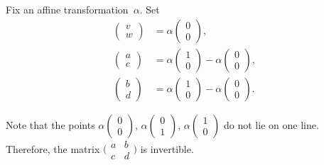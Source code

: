 Fix an affine transformation~$\alpha$.
Set 
\begin{align*}
\left(\begin{smallmatrix}
v\\ w
\end{smallmatrix} \right)
&= 
\alpha\left(\begin{smallmatrix}
0\\ 0
\end{smallmatrix} \right),
\\
\left(\begin{smallmatrix}
a\\ c
\end{smallmatrix} \right)
&=
\alpha\left(\begin{smallmatrix}
1\\ 0
\end{smallmatrix} \right)
-
\alpha\left(\begin{smallmatrix}
0\\ 0
\end{smallmatrix} \right),
\\
\left(\begin{smallmatrix}
b\\ d
\end{smallmatrix} \right)
&=
\alpha\left(\begin{smallmatrix}
1\\ 0
\end{smallmatrix} \right)
-
\alpha\left(\begin{smallmatrix}
0\\ 0
\end{smallmatrix} \right).
\end{align*}


Note that the points 
$\alpha\left(\begin{smallmatrix}
0\\ 0
\end{smallmatrix} \right)$, 
$\alpha\left(\begin{smallmatrix}
0\\ 1
\end{smallmatrix} \right)$, 
$\alpha\left(\begin{smallmatrix}
1\\ 0
\end{smallmatrix} \right)$ do not lie on one line. 
Therefore, the matrix $\bigl(\begin{smallmatrix}
a&b\\ c&d
\end{smallmatrix} \bigr)$
is invertible.

